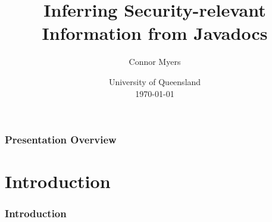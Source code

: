 \documentclass[
	11pt, %
]{beamer}
\title[]{Inferring Security-relevant Information from Javadocs} %
\author[Connor Myers]{Connor Myers} %
\date[\today]{University of Queensland \\ \today} %
\begin{document}

\begin{frame}
	\titlepage %
\end{frame}



\begin{frame}
	\frametitle{Presentation Overview} %
	
	\tableofcontents %
\end{frame}



\section{Introduction}

\begin{frame}
	\frametitle{Introduction}
\end{frame}
\end{document}
